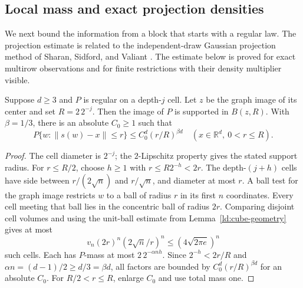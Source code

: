 \subsection{Local mass and exact projection densities}

We next bound the information from a block that starts with a regular
law.  The projection estimate is related to the independent-draw
Gaussian projection method of Sharan, Sidford, and Valiant
\cite[Section~7, Lemma~12]{SSV2019}.  The estimate below is proved
for exact multirow observations and for finite restrictions with their
density multiplier visible.

\begin{lemma}\label{l:finite-entropy:ball}
Suppose \(d\ge3\) and \(P\) is regular on a depth-\(j\) cell.
Let \(z\) be the graph image of its center and set \(R=2\,2^{-j}\).
Then the image of \(P\) is supported in \(B(z,R)\).  With
\(\beta=1/3\), there is an absolute \(C_0\ge1\) such that
\begin{equation}\label{l:finite-entropy:ball-bound}
 P\{w:\|s(w)-x\|\le r\}
 \le C_0^d(r/R)^{\beta d}
 \quad(x\in\mathbb R^d,\ 0<r\le R).
\end{equation}
\end{lemma}

\begin{proof}
The cell diameter is \(2^{-j}\); the \(2\)-Lipschitz property gives
the stated support radius.  For \(r\le R/2\), choose \(h\ge1\)
with \(r\le R2^{-h}<2r\).  The depth-\((j+h)\) cells have side
between \(r/(2\sqrt n)\) and \(r/\sqrt n\), and diameter at most
\(r\).  A ball test for the graph image restricts \(w\) to a ball
of radius \(r\) in its first \(n\) coordinates.  Every cell meeting
that ball lies in the concentric ball of radius \(2r\).  Comparing
disjoint cell volumes and using the unit-ball estimate from
Lemma~\ref{ld:cube-geometry} gives at most
\[
 v_n(2r)^n(2\sqrt n/r)^n\le(4\sqrt{2\pi e})^n
\]
such cells.  Each has \(P\)-mass at most \(2\,2^{-\alpha nh}\).
Since \(2^{-h}<2r/R\) and
\(\alpha n=(d-1)/2\ge d/3=\beta d\), all factors are bounded
by \(C_0^d(r/R)^{\beta d}\) for an absolute \(C_0\).
For \(R/2<r\le R\), enlarge \(C_0\) and use total mass one.
\end{proof}

